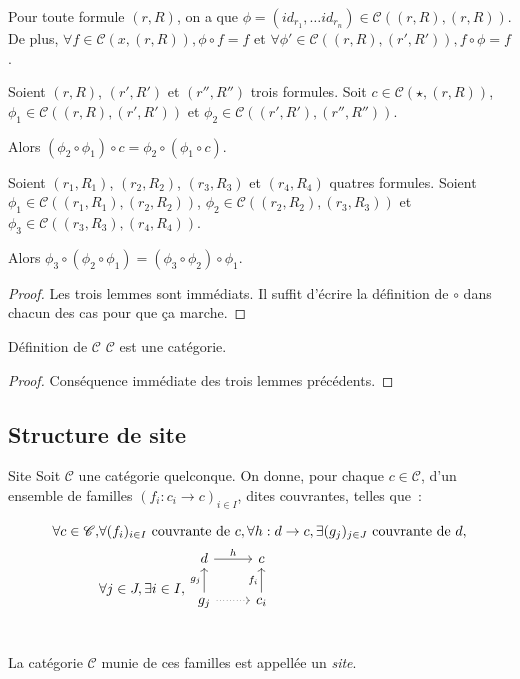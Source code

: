 \documentclass[12pt]{article}
\renewcommand\C{\mathscr{C}}
\begin{document}
\begin{lem}
    Pour toute formule $(r,R)$, on a que
        $\phi=(id_{r_1},\dots id_{r_n})\in\C((r,R),(r,R))$.
    De plus, $\forall f\in\C(x, (r,R)), \phi\circ f = f$
    et $\forall \phi'\in\C((r,R), (r',R')), f\circ\phi = f$.
\end{lem}

\begin{lem}
    Soient $(r,R)$, $(r',R')$ et $(r'',R'')$ trois formules. Soit $c\in\C(\star,(r,R))$,
    $\phi_1\in\C((r,R), (r',R'))$ et $\phi_2\in\C((r',R'), (r'',R''))$.

    Alors $(\phi_2\circ\phi_1)\circ c = \phi_2\circ (\phi_1\circ c)$.
\end{lem}

\begin{lem}
    Soient $(r_1,R_1)$, $(r_2,R_2)$, $(r_3,R_3)$ et $(r_4,R_4)$ quatres formules.
    Soient $\phi_1\in\C((r_1,R_1), (r_2,R_2))$, $\phi_2\in\C((r_2,R_2), (r_3,R_3))$ et
    $\phi_3\in\C((r_3,R_3),(r_4,R_4))$.

    Alors $\phi_3\circ(\phi_2\circ\phi_1) = (\phi_3\circ\phi_2)\circ\phi_1$.
\end{lem}

\begin{proof} Les trois lemmes sont immédiats. Il suffit d'écrire la définition de $\circ$
    dans chacun des cas pour que ça marche.
\end{proof}

\begin{theo}{Définition de $\C$}
    $\C$ est une catégorie.
\end{theo}

\begin{proof} Conséquence immédiate des trois lemmes précédents.
\end{proof}
\subsection{Structure de site}

\begin{defi}{Site}
    Soit $\C$ une catégorie quelconque. On donne, pour
    chaque $c\in\C$, d'un ensemble de familles $(f_i : c_i\rightarrow c)_{i\in I}$,
    dites couvrantes, telles que~:

    \begin{align*}
        \forall c\in\C, & \forall (f_i)_{i\in I} \text{ couvrante de } c,
          \forall h : d\rightarrow c, \exists (g_j)_{j\in J} \text{ couvrante de } d, \\
        & \forall j\in J, \exists i\in I,
          \begin{tikzcd}[ampersand replacement=\&]
            d \arrow[r, "h"] \& c \\
            g_j \arrow[u, "g_j"] \arrow[r, dotted] \& c_i \arrow[u, "f_i"] \\
          \end{tikzcd}
    \end{align*}

    La catégorie $\C$ munie de ces familles est appellée un \emph{site}.
\end{defi}
\end{document}
